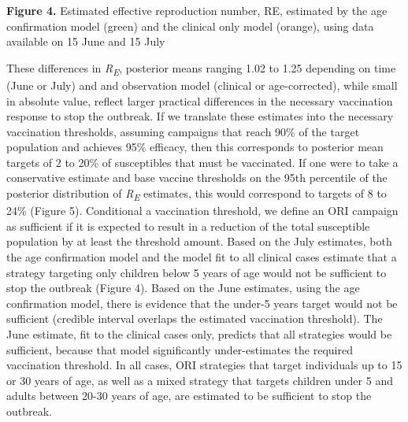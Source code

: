 \textbf{Figure 4.} Estimated effective reproduction number, RE,
estimated by the age confirmation model (green) and the clinical only
model (orange), using data available on 15 June and 15 July

These differences in \emph{R\textsubscript{E}}, posterior means ranging
1.02 to 1.25 depending on time (June or July) and and observation model
(clinical or age-corrected), while small in absolute value, reflect
larger practical differences in the necessary vaccination response to
stop the outbreak. If we translate these estimates into the necessary
vaccination thresholds, assuming campaigns that reach 90\% of the target
population and achieves 95\% efficacy, then this corresponds to
posterior mean targets of 2 to 20\% of susceptibles that must be
vaccinated. If one were to take a conservative estimate and base vaccine
thresholds on the 95th percentile of the posterior distribution of
\emph{R\textsubscript{E}} estimates, this would correspond to targets of
8 to 24\% (Figure 5). Conditional a vaccination threshold, we define an
ORI campaign as sufficient if it is expected to result in a reduction of
the total susceptible population by at least the threshold amount. Based
on the July estimates, both the age confirmation model and the model fit
to all clinical cases estimate that a strategy targeting only children
below 5 years of age would not be sufficient to stop the outbreak
(Figure 4). Based on the June estimates, using the age confirmation
model, there is evidence that the under-5 years target would not be
sufficient (credible interval overlaps the estimated vaccination
threshold). The June estimate, fit to the clinical cases only, predicts
that all strategies would be sufficient, because that model
significantly under-estimates the required vaccination threshold. In all
cases, ORI strategies that target individuals up to 15 or 30 years of
age, as well as a mixed strategy that targets children under 5 and
adults between 20-30 years of age, are estimated to be sufficient to
stop the outbreak.